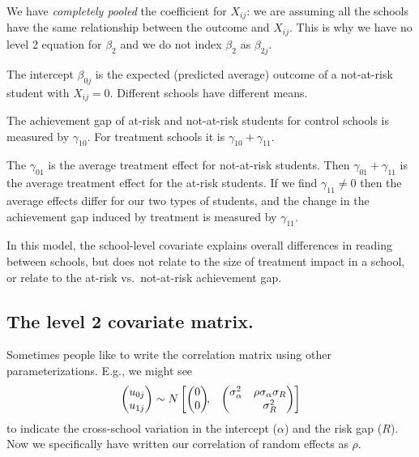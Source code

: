 \documentclass[
  letterpaper,
  DIV=11,
  numbers=noendperiod]{scrreprt}
\begin{document}
We have \emph{completely pooled} the coefficient for \(X_{ij}\): we are
assuming all the schools have the same relationship between the outcome
and \(X_{ij}\). This is why we have no level 2 equation for
\(\beta_{2}\) and we do not index \(\beta_2\) as \(\beta_{2j}\).

The intercept \(\beta_{0j}\) is the expected (predicted average) outcome
of a not-at-risk student with \(X_{ij} = 0\). Different schools have
different means.

The achievement gap of at-risk and not-at-risk students for control
schools is measured by \(\gamma_{10}\). For treatment schools it is
\(\gamma_{10} + \gamma_{11}\).

The \(\gamma_{01}\) is the average treatment effect for not-at-risk
students. Then \(\gamma_{01} + \gamma_{11}\) is the average treatment
effect for the at-risk students. If we find \(\gamma_{11} \neq 0\) then
the average effects differ for our two types of students, and the change
in the achievement gap induced by treatment is measured by
\(\gamma_{11}\).

In this model, the school-level covariate explains overall differences
in reading between schools, but does not relate to the size of treatment
impact in a school, or relate to the at-risk vs.~not-at-risk achievement
gap.

\hypertarget{the-level-2-covariate-matrix.}{%
\subsection{The level 2 covariate
matrix.}\label{the-level-2-covariate-matrix.}}

Sometimes people like to write the correlation matrix using other
parameterizations. E.g., we might see \[\begin{pmatrix} u_{0j} \\
u_{1j}
\end{pmatrix} \sim  N
\begin{bmatrix}
\begin{pmatrix}
0 \\
0
\end{pmatrix}\!\!,&
\begin{pmatrix}
\sigma^2_\alpha & \rho \sigma_\alpha \sigma_R \\
 & \sigma^2_R \\
\end{pmatrix}
\end{bmatrix}\\[2\jot]\] to indicate the cross-school variation in the
intercept (\(\alpha\)) and the risk gap (\(R\)). Now we specifically
have written our correlation of random effects as \(\rho\).
\end{document}
